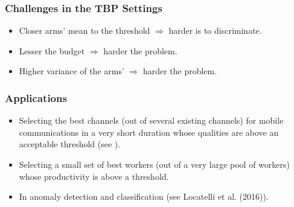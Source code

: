 \begin{frame}
\frametitle{Challenges in the TBP Settings}

\begin{itemize}
\item<1-> Closer arms' mean to the threshold $\Rightarrow$ harder is to discriminate.
\item<2-> Lesser the budget $\Rightarrow$ harder the problem.
\item<3-> Higher variance of the arms' $\Rightarrow$ harder the problem.
\end{itemize}

\end{frame}


\begin{frame}
\frametitle{Applications}
\begin{itemize}
\item<1-> Selecting the best channels (out of several existing channels) for mobile communications in a very short duration whose qualities are above an acceptable threshold (see \cite{audibert2010best}).
\item<2-> Selecting a small set of best workers (out of a very large pool of workers) whose productivity is above a threshold.
\item<3-> In anomaly detection and classification (see {Locatelli et al. (2016)}).
\end{itemize}
\end{frame}

